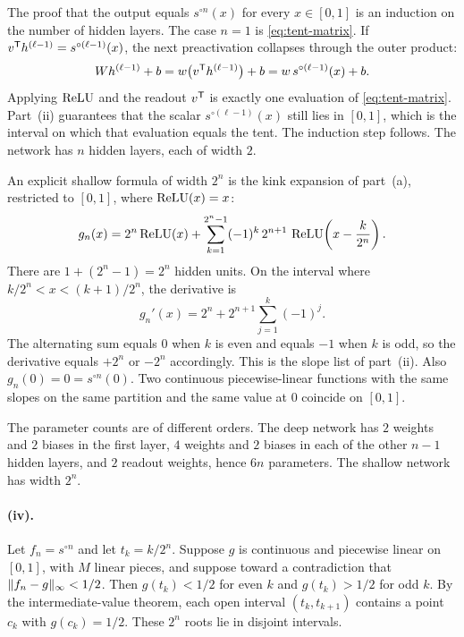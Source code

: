 The proof that the output equals \(s^{\circ n}(x)\) for every \(x\in[0,1]\) is an induction on the number of hidden layers. The case \(n=1\) is \eqref{eq:tent-matrix}. If \(v^{\mathsf{T}} h^{(\ell-1)} = s^{\circ(\ell-1)}(x)\), the next preactivation collapses through the outer product:
\[
  W h^{(\ell-1)} + b
  =
  w\bigl(v^{\mathsf{T}} h^{(\ell-1)}\bigr) + b
  =
  w\, s^{\circ(\ell-1)}(x) + b.
\]
Applying \(\operatorname{ReLU}\) and the readout \(v^{\mathsf{T}}\) is exactly one evaluation of \eqref{eq:tent-matrix}. Part~(ii) guarantees that the scalar \(s^{\circ(\ell-1)}(x)\) still lies in \([0,1]\), which is the interval on which that evaluation equals the tent. The induction step follows. The network has \(n\) hidden layers, each of width \(2\).

An explicit shallow formula of width \(2^n\) is the kink expansion of part~(a), restricted to \([0,1]\), where \(\operatorname{ReLU}(x)=x\):
\begin{equation}
  g_n(x)
  =
  2^n \operatorname{ReLU}(x)
  + \sum_{k=1}^{2^n-1} (-1)^k\, 2^{n+1}\,
    \operatorname{ReLU}\!\left(x-\frac{k}{2^n}\right).
  \label{eq:shallow-iter}
\end{equation}
There are \(1+(2^n-1)=2^n\) hidden units. On the interval where \(k/2^n < x < (k+1)/2^n\), the derivative is
\[
  g_n'(x)
  =
  2^n + 2^{n+1}\sum_{j=1}^{k}(-1)^j.
\]
The alternating sum equals \(0\) when \(k\) is even and equals \(-1\) when \(k\) is odd, so the derivative equals \(+2^n\) or \(-2^n\) accordingly. This is the slope list of part~(ii). Also \(g_n(0)=0=s^{\circ n}(0)\). Two continuous piecewise-linear functions with the same slopes on the same partition and the same value at \(0\) coincide on \([0,1]\).

The parameter counts are of different orders. The deep network has \(2\) weights and \(2\) biases in the first layer, \(4\) weights and \(2\) biases in each of the other \(n-1\) hidden layers, and \(2\) readout weights, hence \(6n\) parameters. The shallow network has width \(2^n\).

\paragraph{(iv).}
Let \(f_n = s^{\circ n}\) and let \(t_k = k/2^n\). Suppose \(g\) is continuous and piecewise linear on \([0,1]\), with \(M\) linear pieces, and suppose toward a contradiction that \(\lVert f_n-g\rVert_\infty < 1/2\). Then \(g(t_k)<1/2\) for even \(k\) and \(g(t_k)>1/2\) for odd \(k\). By the intermediate-value theorem, each open interval \((t_k,t_{k+1})\) contains a point \(c_k\) with \(g(c_k)=1/2\). These \(2^n\) roots lie in disjoint intervals.

